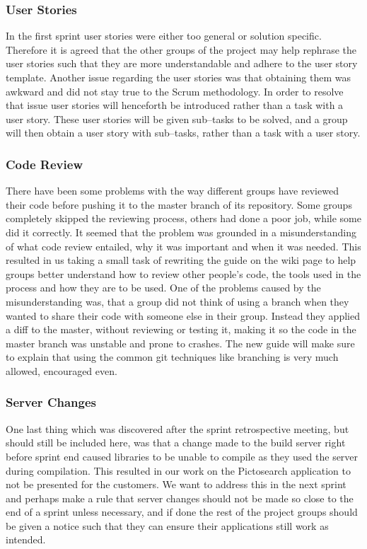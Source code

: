 \subsubsection{User Stories}
In the first sprint user stories were either too general or solution specific.
Therefore it is agreed that the other groups of the project may help rephrase the user stories such that they are more understandable and adhere to the user story template.
Another issue regarding the user stories was that obtaining them was awkward and did not stay true to the Scrum methodology.
In order to resolve that issue user stories will henceforth be introduced rather than a task with a user story.
These user stories will be given sub--tasks to be solved, and a group will then obtain a user story with sub--tasks, rather than a task with a user story.

\subsubsection{Code Review}
There have been some problems with the way different groups have reviewed their code before pushing it to the master branch of its repository.
Some groups completely skipped the reviewing process, others had done a poor job, while some did it correctly.
It seemed that the problem was grounded in a misunderstanding of what code review entailed, why it was important and when it was needed.
This resulted in us taking a small task of rewriting the guide on the wiki page to help groups better understand how to review other people's code, the tools used in the process and how they are to be used.
One of the problems caused by the misunderstanding was, that a group did not think of using a branch when they wanted to share their code with someone else in their group.
Instead they applied a diff to the master, without reviewing or testing it, making it so the code in the master branch was unstable and prone to crashes.
The new guide will make sure to explain that using the common git techniques like branching is very much allowed, encouraged even.

\subsubsection{Server Changes}
One last thing which was discovered after the sprint retrospective meeting, but should still be included here, was that a change made to the build server right before sprint end caused libraries to be unable to compile as they used the server during compilation.
This resulted in our work on the Pictosearch application to not be presented for the customers.
We want to address this in the next sprint and perhaps make a rule that server changes should not be made so close to the end of a sprint unless necessary, and if done the rest of the project groups should be given a notice such that they can ensure their applications still work as intended.

